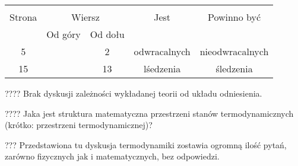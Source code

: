 \documentclass[a4paper,11pt]{article}
\begin{document}
\begin{center}

  \begin{tabular}{|c|c|c|c|c|}
    \hline
    & \multicolumn{2}{c|}{} & & \\
    Strona & \multicolumn{2}{c|}{Wiersz} & Jest
                              & Powinno być \\ \cline{2-3}
    & Od góry & Od dołu & & \\
    \hline
    5   & &  2 & odwracalnych & nieodwracalnych \\
    15  & & 13 & lśedzenia & śledzenia \\
    \hline
  \end{tabular}

\end{center}

\vspace{\spaceTwo}














???? Brak dyskusji zależności wykładanej teorii od układu odniesienia.

\vspace{\spaceFour}



???? Jaka jest struktura matematyczna przestrzeni stanów termodynamicznych
(krótko: przestrzeni termodynamicznej)?

\vspace{\spaceFour}



??? Przedstawiona tu dyskusja termodynamiki zostawia ogromną ilość pytań,
zarówno fizycznych jak i matematycznych, bez odpowiedzi.
\end{document}

